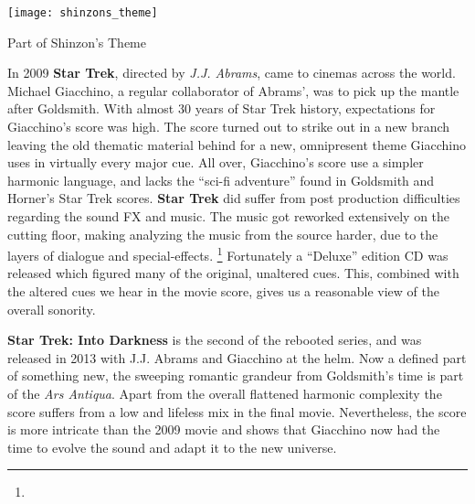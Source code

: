 \begin{marginfigure}
\texttt{[image: shinzons\_theme]}
	\caption{Part of Shinzon's Theme}
	\label{shinzons_theme}
\end{marginfigure}

In 2009 \textbf{Star Trek}, directed by \textit{J.J. Abrams}, came to cinemas across the world. Michael Giacchino, a regular collaborator of Abrams', was to pick up the mantle after Goldsmith. With almost 30 years of Star Trek history, expectations for Giacchino's score was high. The score turned out to strike out in a new branch leaving the old thematic material behind for a new, omnipresent theme Giacchino uses in virtually every major cue. All over, Giacchino's score use a simpler harmonic language, and lacks the ``sci-fi adventure'' found in Goldsmith and Horner's Star Trek scores. \textbf{Star Trek} did suffer from post production difficulties regarding the sound FX and music. The music got reworked extensively on the cutting floor, making analyzing the music from the source harder, due to the layers of dialogue and special-effects.
\footnote{
}
Fortunately a ``Deluxe'' edition CD was released which figured many of the original, unaltered cues. This, combined with the altered cues we hear in the movie score, gives us a reasonable view of the overall sonority.

\textbf{Star Trek: Into Darkness} is the second of the rebooted series, and was released in 2013 with J.J. Abrams and Giacchino at the helm. Now a defined part of something new, the sweeping romantic grandeur from Goldsmith's time is part of the \textit{Ars Antiqua}. Apart from the overall flattened harmonic complexity the score suffers from a low and lifeless mix in the final movie. Nevertheless, the score is more intricate than the 2009 movie and shows that Giacchino now had the time to evolve the sound and adapt it to the new universe.

